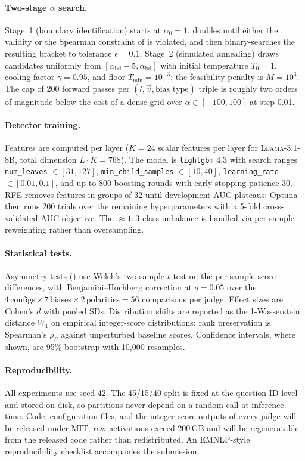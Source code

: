 \documentclass[11pt]{article}
\let\Cref\crtCref
\begin{document}
\paragraph{Two-stage $\alpha$ search.}
Stage~1 (boundary identification) starts at $\alpha_0{=}1$, doubles until either the validity or the Spearman constraint of \Cref{eq:alpha_obj} is violated, and then binary-searches the resulting bracket to tolerance $\epsilon{=}0.1$. Stage~2 (simulated annealing) draws candidates uniformly from $[\alpha_{\text{bd}}-5,\alpha_{\text{bd}}]$ with initial temperature $T_0{=}1$, cooling factor $\gamma{=}0.95$, and floor $T_{\min}{=}10^{-3}$; the feasibility penalty is $M{=}10^{3}$. The cap of 200 forward passes per $(l,\vec{v},\text{bias type})$ triple is roughly two orders of magnitude below the cost of a dense grid over $\alpha\in[-100,100]$ at step 0.01.

\paragraph{Detector training.}
Features are computed per layer ($K{=}24$ scalar features per layer for \textsc{Llama-3.1-8B}, total dimension $L \cdot K = 768$). The model is \texttt{lightgbm} 4.3 with search ranges \texttt{num\_leaves} $\in [31,127]$, \texttt{min\_child\_samples} $\in [10,40]$, \texttt{learning\_rate} $\in [0.01,0.1]$, and up to 800 boosting rounds with early-stopping patience 30. RFE removes features in groups of 32 until development AUC plateaus; Optuna then runs 200 trials over the remaining hyperparameters with a 5-fold cross-validated AUC objective. The $\approx 1{:}3$ class imbalance is handled via per-sample reweighting rather than oversampling.

\paragraph{Statistical tests.}
Asymmetry tests (\Cref{subsec:asymmetry}) use Welch's two-sample $t$-test on the per-sample score differences, with Benjamini--Hochberg correction at $q{=}0.05$ over the $4\,\text{configs}\times 7\,\text{biases}\times 2\,\text{polarities}=56$ comparisons per judge. Effect sizes are Cohen's $d$ with pooled SDs. Distribution shifts are reported as the 1-Wasserstein distance $W_1$ on empirical integer-score distributions; rank preservation is Spearman's $\rho_S$ against unperturbed baseline scores. Confidence intervals, where shown, are 95\% bootstrap with 10{,}000 resamples.

\paragraph{Reproducibility.}
All experiments use seed 42. The 45/15/40 split is fixed at the question-ID level and stored on disk, so partitions never depend on a random call at inference time. Code, configuration files, and the integer-score outputs of every judge will be released under MIT; raw activations exceed 200\,GB and will be regeneratable from the released code rather than redistributed. An EMNLP-style reproducibility checklist accompanies the submission.
\end{document}
